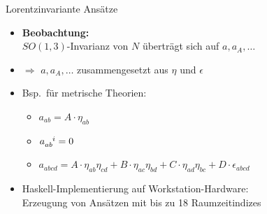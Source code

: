 \documentclass{beamer}
\begin{document}
    \begin{frame}{Lorentzinvariante Ansätze}
        \begin{itemize}
            \item \textbf{Beobachtung:} \\ $SO(1,3)$-Invarianz von $N$ überträgt sich auf $a, a_A, \ldots$
            \item $\Rightarrow$ $a, a_A, \ldots$ zusammengesetzt aus $\eta$ und $\epsilon$
            \item Bsp.\ für metrische Theorien:
            \begin{itemize}
                \item $a_{ab} = A \cdot \eta_{ab}$
                \item $a_{ab}^{\hphantom{ab}i} = 0$
                \item $a_{abcd} = A\cdot \eta_{ab} \eta_{cd} + B\cdot \eta_{ac} \eta_{bd} + C\cdot \eta_{ad} \eta_{bc} + D \cdot \epsilon_{abcd}$
            \end{itemize}
            \item Haskell-Implementierung auf Workstation-Hardware: \\
            Erzeugung von Ansätzen mit bis zu 18 Raumzeitindizes
        \end{itemize}
    \end{frame}
\end{document}
